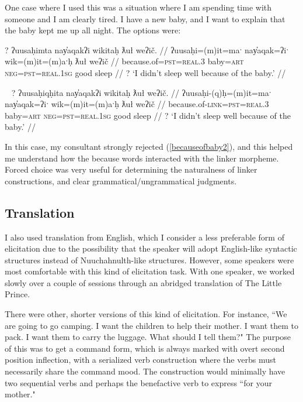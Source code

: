 One case where I used this was a situation where I am spending time with someone and I am clearly tired. I have a new baby, and I want to explain that the baby kept me up all night. The options were:

\ex \label{becauseofbaby1}
\begingl
\glpreamble ? ʔuusaḥimta nay̓aqakʔi wikitaḥ ƛuł weʔič. //
\gla ʔuusaḥi=(m)it=maˑ nay̓aqak=ʔiˑ wik=(m)it=(m)aˑḥ ƛuł weʔič //
\glb because.of=\textsc{pst}=\textsc{real.3} baby=\textsc{art} \textsc{neg}=\textsc{pst}=\textsc{real.1sg} good sleep //
\glft ? `I didn't sleep well because of the baby.' //
\endgl
\xe

\ex~ \label{becauseofbaby2}
\begingl
\glpreamble ? ʔuusaḥiqḥita nay̓aqakʔi wikitaḥ ƛuł weʔič. //
\gla ʔuusaḥi-(q)ḥ=(m)it=maˑ nay̓aqak=ʔiˑ wik=(m)it=(m)aˑḥ ƛuł weʔič //
\glb because.of-\textsc{link}=\textsc{pst}=\textsc{real.3} baby=\textsc{art} \textsc{neg}=\textsc{pst}=\textsc{real.1sg} good sleep //
\glft ? `I didn't sleep well because of the baby.' //
\endgl
\xe

In this case, my consultant strongly rejected (\ref{becauseofbaby2}), and this helped me understand how the because words interacted with the linker morpheme. Forced choice was very useful for determining the naturalness of linker constructions, and clear grammatical/ungrammatical judgments.

\subsection{Translation}

I also used translation from English, which I consider a less preferable form of elicitation due to the possibility that the speaker will adopt English-like syntactic structures instead of Nuuchahnulth-like structures. However, some speakers were most comfortable with this kind of elicitation task. With one speaker, we worked slowly over a couple of sessions through an abridged translation of The Little Prince.

There were other, shorter versions of this kind of elicitation. For instance, ``We are going to go camping. I want the children to help their mother. I want them to pack. I want them to carry the luggage. What should I tell them?" The purpose of this was to get a command form, which is always marked with overt second position inflection, with a serialized verb construction where the verbs must necessarily share the command mood. The construction would minimally have two sequential verbs and perhaps the benefactive verb to express ``for your mother."

